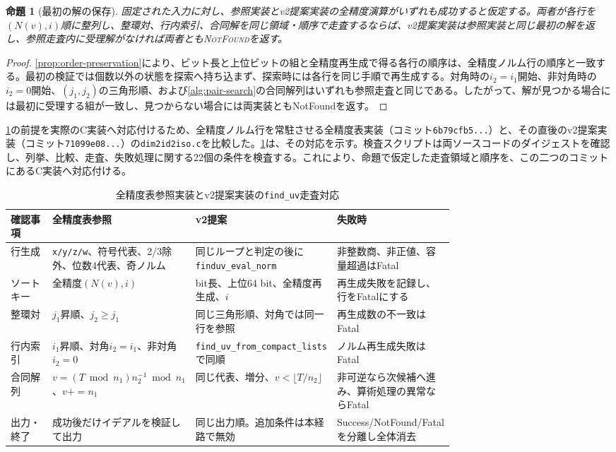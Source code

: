 \documentclass[a4paper,10pt]{ltjsarticle}
\newtheorem{proposition}{命題}
\theoremstyle{definition}
\theoremstyle{remark}
\begin{document}
\begin{proposition}[最初の解の保存]
\label{prop:first-solution}
固定された入力に対し、参照実装とv2提案実装の全精度演算がいずれも成功すると仮定する。両者が各行を$(N(v),i)$順に整列し、整環対、行内索引、合同解を同じ領域・順序で走査するならば、v2提案実装は参照実装と同じ最初の解を返し、参照走査内に受理解がなければ両者とも\textup{\textsc{NotFound}}を返す。
\end{proposition}

\begin{proof}
\cref{prop:order-preservation}により、ビット長と上位ビットの組と全精度再生成で得る各行の順序は、全精度ノルム行の順序と一致する。最初の検証では個数以外の状態を探索へ持ち込まず、探索時には各行を同じ手順で再生成する。対角時の$i_2=i_1$開始、非対角時の$i_2=0$開始、$(j_1,j_2)$の三角形順、および\cref{alg:pair-search}の合同解列はいずれも参照走査と同じである。したがって、解が見つかる場合には最初に受理する組が一致し、見つからない場合には両実装ともNotFoundを返す。
\end{proof}

\cref{prop:first-solution}の前提を実際のC実装へ対応付けるため、全精度ノルム行を常駐させる全精度表実装（コミット\texttt{6b79cfb5...}）と、その直後のv2提案実装（コミット\texttt{71099e08...}）の\texttt{dim2id2iso.c}を比較した。\cref{tab:finduv-correspondence}は、その対応を示す。検査スクリプトは両ソースコードのダイジェストを確認し、列挙、比較、走査、失敗処理に関する22個の条件を検査する。これにより、命題で仮定した走査領域と順序を、この二つのコミットにあるC実装へ対応付ける。

\begin{table}[H]
  \centering
  \caption{全精度表参照実装とv2提案実装の\texttt{find\_uv}走査対応}
  \label{tab:finduv-correspondence}
  \scriptsize
  \begin{tabularx}{\linewidth}{@{}p{0.17\linewidth}p{0.25\linewidth}p{0.31\linewidth}X@{}}
    \toprule
    確認事項 & 全精度表参照 & v2提案 & 失敗時 \\
    \midrule
    行生成 & \texttt{x/y/z/w}、符号代表、2/3除外、位数4代表、奇ノルム & 同じループと判定の後に\texttt{finduv\_eval\_norm} & 非整数商、非正値、容量超過はFatal \\
    ソートキー & 全精度$(N(v),i)$ & bit長、上位64 bit、全精度再生成、$i$ & 再生成失敗を記録し、行をFatalにする \\
    整環対 & $j_1$昇順、$j_2\geq j_1$ & 同じ三角形順、対角では同一行を参照 & 再生成数の不一致はFatal \\
    行内索引 & $i_1$昇順、対角$i_2=i_1$、非対角$i_2=0$ & \texttt{find\_uv\_from\_compact\_lists}で同順 & ノルム再生成失敗はFatal \\
    合同解列 & $v=(T\bmod n_1)n_2^{-1}\bmod n_1$、$v{+}{=}n_1$ & 同じ代表、増分、$v<\lfloor T/n_2\rfloor$ & 非可逆なら次候補へ進み、算術処理の異常ならFatal \\
    出力・終了 & 成功後だけイデアルを検証して出力 & 同じ出力順。追加条件は本経路で無効 & Success/NotFound/Fatalを分離し全体消去 \\
    \bottomrule
  \end{tabularx}
\end{table}
\end{document}
